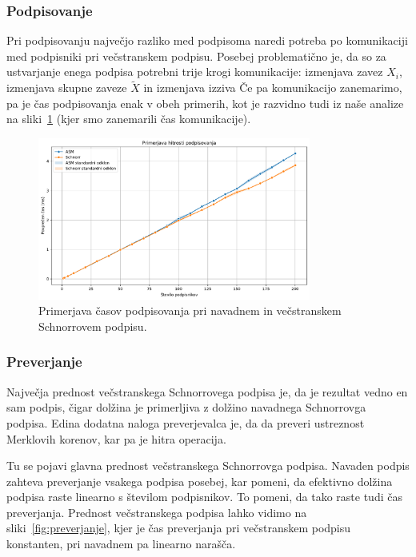 \documentclass[isrm2, tisk]{fmfdelo}
\begin{document}
\subsubsection{Podpisovanje}
Pri podpisovanju največjo razliko med podpisoma naredi potreba po komunikaciji med podpisniki pri
večstranskem podpisu. Posebej problematično je, da so za ustvarjanje enega podpisa potrebni trije
krogi komunikacije: izmenjava zavez $X_i$, izmenjava skupne zaveze $\tilde{X}$ in izmenjava izziva
Če pa komunikacijo zanemarimo, pa je čas podpisovanja enak v obeh primerih, kot je razvidno tudi
iz naše analize na sliki~\ref{fig:podpisovanje} (kjer smo zanemarili čas komunikacije).


\begin{figure}[ht]
  \centering
  \includegraphics[width=0.8\textwidth]{images/benchmark_Signing.pdf}
  \caption[Podpisovanje.]{Primerjava časov podpisovanja pri navadnem in večstranskem
    Schnorrovem podpisu.}
  \label{fig:podpisovanje}
\end{figure}

\subsubsection{Preverjanje}
Največja prednost večstranskega Schnorrovega podpisa je, da je rezultat vedno en sam podpis, čigar
dolžina je primerljiva z dolžino navadnega Schnorrovga podpisa. Edina dodatna naloga preverjevalca
je, da da preveri ustreznost Merklovih korenov, kar pa je hitra operacija.

Tu se pojavi glavna prednost večstranskega Schnorrovga podpisa. Navaden podpis zahteva preverjanje
vsakega podpisa posebej, kar pomeni, da efektivno dolžina podpisa raste linearno s številom podpisnikov.
To pomeni, da tako raste tudi čas preverjanja. Prednost večstranskega podpisa lahko vidimo na
sliki~\ref{fig:preverjanje}, kjer je čas preverjanja pri večstranskem podpisu konstanten, pri
navadnem pa linearno narašča.
\end{document}
